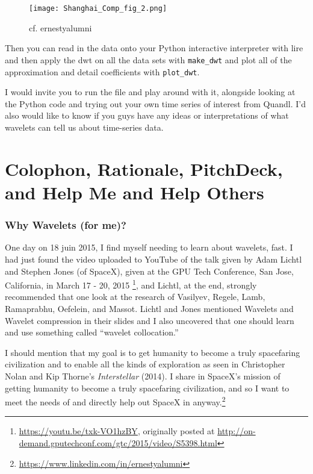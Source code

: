 \documentclass[twoside]{amsart}
\theoremstyle{plain}
\theoremstyle{definition}
\theoremstyle{remark}
\numberwithin{equation}{section}
\begin{document}
\begin{figure}[h!]\label{Fig:Shanghai_Comp_fig_2}
 \caption{cf. ernestyalumni}
 \centering
   \texttt{[image: Shanghai\_Comp\_fig\_2.png]}
\end{figure}


Then you can read in the data onto your Python interactive interpreter with lire and then apply the dwt on all the data sets with \verb|make_dwt| and plot all of the approximation and detail coefficients with \verb|plot_dwt|.  

I would invite you to run the file and play around with it, alongside looking at the Python code and trying out your own time series of interest from Quandl.  I'd also would like to know if you guys have any ideas or interpretations of what wavelets can tell us about time-series data.  

\part{Colophon, Rationale, PitchDeck, and Help Me and Help Others}\label{Part:Colophon}

\section{Why Wavelets (for me)?}

One day on 18 juin 2015, I find myself needing to learn about wavelets, fast. I had just found the video uploaded to YouTube of the talk given by Adam Lichtl and Stephen Jones (of SpaceX), given at the GPU Tech Conference, San Jose, California, in March 17 - 20, 2015 \footnote{\url{https://youtu.be/txk-VO1hzBY}, originally posted at \url{http://on-demand.gputechconf.com/gtc/2015/video/S5398.html}}, and Lichtl, at the end, strongly recommended that one look at the research of Vasilyev, Regele, Lamb, Ramaprabhu, Oefelein, and Massot.  Lichtl and Jones mentioned Wavelets and Wavelet compression in their slides and I also uncovered that one should learn and use something called ``wavelet collocation.''  

I should mention that my goal is to get humanity to become a truly spacefaring civilization and to enable all the kinds of exploration as seen in Christopher Nolan and Kip Thorne's \emph{Interstellar} (2014).  I share in SpaceX's mission of getting humanity to become a truly spacefaring civilization, and so I want to meet the needs of and directly help out SpaceX in anyway.\footnote{\url{https://www.linkedin.com/in/ernestyalumni}}
\end{document}
